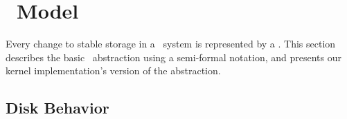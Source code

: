 
\section{\Patch\ Model}
\label{sec:patch}

\makeatletter
\let\emptyset\varnothing
\newcommand{\PBlock}[1]{\ensuremath{B_{#1}}}
\newcommand{\PSetlim}[1]{\def\@next{#1}\ifx\@next\@empty\else_{\@next}\fi}
\newcommand{\PMem}[1][]{\ensuremath{\mathbf{U}\PSetlim{#1}}}
\newcommand{\PInf}[1][]{\ensuremath{\mathbf{F}\PSetlim{#1}}}
\newcommand{\PDisk}[1][]{\ensuremath{\mathbf{C}\PSetlim{#1}}}
\newcommand{\PHard}[1][]{\ensuremath{\textit{\Nrb}\PSetlim{#1}}}
\newcommand{\PSoft}[1][]{\ensuremath{\textit{\Rb}\PSetlim{#1}}}
\newcommand{\PEmpty}[1][]{\ensuremath{\textit{\Noop}\PSetlim{#1}}}
\newcommand{\PDDepset}[1]{\ensuremath{\textit{Dep}_1[#1]}}
\newcommand{\PDepend}{\ensuremath{\leadsto}}
\newcommand{\PDDepend}{\ensuremath{\rightarrow}}
\newcommand{\PDepset}[1]{\ensuremath{\textit{Dep}[#1]}}
\newcommand{\PRDepset}[1]{\ensuremath{\textit{RDep}[#1]}}
\makeatother

Every change to stable storage in a \Kudos\ system is represented by a
\emph{\patch}.
%
This section describes the basic \patch\ abstraction using a semi-formal
 notation, and presents our kernel implementation's version of the
 abstraction.

\begin{comment}
%
%
Each \patch\ $p$ encapsulates four important pieces of information: its
 \emph{block}, its \emph{state}, a set of \emph{direct dependencies}, and
 some \emph{undo data}.
\end{comment}

\subsection{Disk Behavior}

